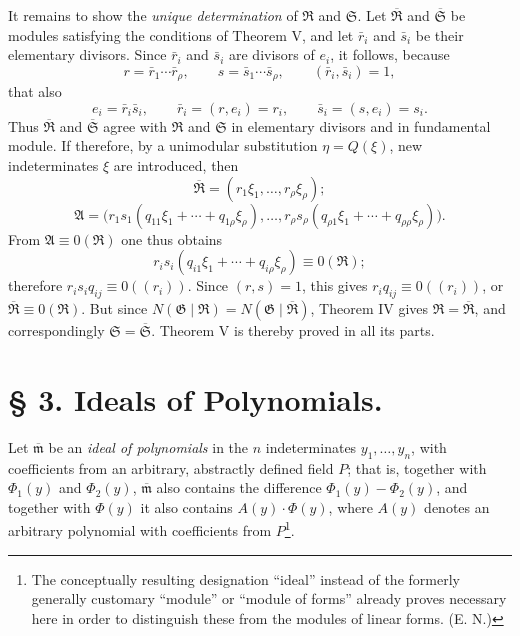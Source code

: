 \documentclass[11pt]{article}
\providecommand{\Amod}{\mathfrak A}
\providecommand{\Gmod}{\mathfrak G}
\providecommand{\Rmod}{\mathfrak R}
\providecommand{\Smod}{\mathfrak S}
\providecommand{\mideal}{\mathfrak m}
\providecommand{\zero}[1]{\equiv 0(#1)}
\providecommand{\Norm}{N}
\providecommand{\Amod}{\mathfrak A}
\providecommand{\Gmod}{\mathfrak G}
\providecommand{\Smod}{\mathfrak S}
\providecommand{\mideal}{\mathfrak m}
\providecommand{\zero}[1]{\equiv 0\pmod{#1}}
\providecommand{\Norm}{N}
\providecommand{\Norm}{\operatorname{N}}
\providecommand{\Norm}{\operatorname{N}}
\begin{document}
It remains to show the \emph{unique determination} of $\Rmod$ and $\Smod$. Let $\overline{\Rmod}$ and $\overline{\Smod}$ be modules satisfying the conditions of Theorem V, and let $\bar r_i$ and $\bar s_i$ be their elementary divisors. Since $\bar r_i$ and $\bar s_i$ are divisors of $e_i$, it follows, because
\[
 r=\bar r_1\cdots\bar r_\rho,
 \qquad
 s=\bar s_1\cdots\bar s_\rho,
 \qquad
 (\bar r_i,\bar s_i)=1,
\]
that also
\[
 e_i=\bar r_i\bar s_i,
 \qquad
 \bar r_i=(r,e_i)=r_i,
 \qquad
 \bar s_i=(s,e_i)=s_i.
\]
Thus $\overline{\Rmod}$ and $\overline{\Smod}$ agree with $\Rmod$ and $\Smod$ in elementary divisors and in fundamental module. If therefore, by a unimodular substitution $\eta=Q(\xi)$, new indeterminates $\xi$ are introduced, then
\[
 \overline{\Rmod}=(r_1\xi_1,\ldots,r_\rho\xi_\rho);
\]
\[
 \Amod=\bigl(r_1s_1(q_{11}\xi_1+\cdots+q_{1\rho}\xi_\rho),\ldots,
 r_\rho s_\rho(q_{\rho1}\xi_1+\cdots+q_{\rho\rho}\xi_\rho)\bigr).
\]
From $\Amod\zero{\Rmod}$ one thus obtains
\[
 r_i s_i(q_{i1}\xi_1+\cdots+q_{i\rho}\xi_\rho)\zero{\Rmod};
\]
therefore $r_is_iq_{ij}\zero{(r_i)}$. Since $(r,s)=1$, this gives $r_iq_{ij}\zero{(r_i)}$, or $\overline{\Rmod}\zero{\Rmod}$. But since $\Norm(\Gmod\mid\Rmod)=\Norm(\Gmod\mid\overline{\Rmod})$, Theorem IV gives $\Rmod=\overline{\Rmod}$, and correspondingly $\Smod=\overline{\Smod}$. Theorem V is thereby proved in all its parts.

\section*{§ 3. Ideals of Polynomials.}

Let $\overline{\mideal}$ be an \emph{ideal of polynomials} in the $n$ indeterminates $y_1,\ldots,y_n$, with coefficients from an arbitrary, abstractly defined field $P$; that is, together with $\Phi_1(y)$ and $\Phi_2(y)$, $\overline{\mideal}$ also contains the difference $\Phi_1(y)-\Phi_2(y)$, and together with $\Phi(y)$ it also contains $A(y)\cdot\Phi(y)$, where $A(y)$ denotes an arbitrary polynomial with coefficients from $P$\footnote{The conceptually resulting designation ``ideal'' instead of the formerly generally customary ``module'' or ``module of forms'' already proves necessary here in order to distinguish these from the modules of linear forms. (E. N.)}.
\end{document}
